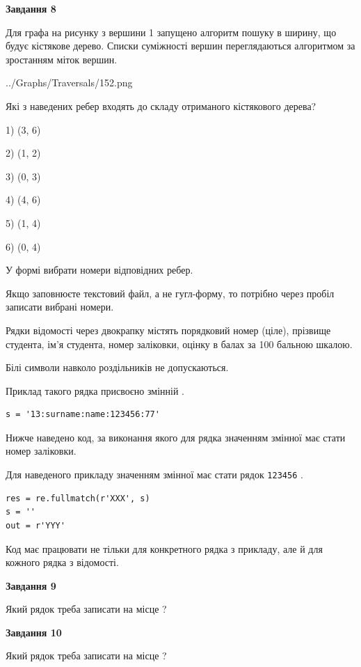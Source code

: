 \documentclass[12pt, ukrainian]{article}
\def\code#1{\Verb!#1!}
\begin{document}
{\begin {large}
{\begin {center}\textbf{Завдання 8}\end {center}}\par
Для графа на рисунку з вершини 1 запущено алгоритм пошуку в ширину, що будує кістякове дерево. Списки суміжності вершин переглядаються алгоритмом за зростанням міток вершин.\par
\begin{center}
	{../Graphs/Traversals/152.png}
\end{center}
\par Які з наведених ребер входять до складу отриманого кістякового дерева?\par
1) (3, 6)\par
2) (1, 2)\par
3) (0, 3)\par
4) (4, 6)\par
5) (1, 4)\par
6) (0, 4)\par
{\vskip 15pt} У формі вибрати номери відповідних ребер.


Якщо заповнюєте текстовий файл, а не гугл-форму, то потрібно через пробіл записа\-ти вибрані номери.\par
\newpage


Рядки відомості через двокрапку містять порядковий номер (ціле), пріз\-ви\-ще студен\-та, ім'я студента, номер заліковки, оцінку в балах за 100 бальною шкалою.

Білі символи навколо роздільників не допускаються.

Приклад такого рядка присвоєно змінній .



\begin{verbatim}
s = '13:surname:name:123456:77'
\end{verbatim}


Нижче наведено код, за виконання якого для рядка  значенням змінної  має стати номер заліковки.

Для наведеного прикладу значенням змінної  має стати рядок \code{123456} .



\begin{verbatim}
res = re.fullmatch(r'XXX', s)
s = ''
out = r'YYY'
\end{verbatim}


Код має працювати не тільки для конкретного рядка з прикладу, але й для кожного рядка з відомості.

{\begin {center}\textbf{Завдання 9}\end {center}}\par
Який рядок треба записати на місце  ?\par
\vspace{5mm}


{\begin {center}\textbf{Завдання 10}\end {center}}\par
Який рядок треба записати на місце  ?\par


\newpage


\end {large}}
\end{document}
